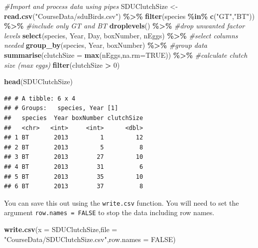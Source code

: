 \documentclass[
  a4paperpaper,
]{book}
\newenvironment{Shaded}{\begin{snugshade}}{\end{snugshade}}
\newcommand{\CommentTok}[1]{\textcolor[rgb]{0.56,0.35,0.01}{\textit{#1}}}
\newcommand{\DataTypeTok}[1]{\textcolor[rgb]{0.13,0.29,0.53}{#1}}
\newcommand{\DecValTok}[1]{\textcolor[rgb]{0.00,0.00,0.81}{#1}}
\newcommand{\KeywordTok}[1]{\textcolor[rgb]{0.13,0.29,0.53}{\textbf{#1}}}
\newcommand{\NormalTok}[1]{#1}
\newcommand{\OperatorTok}[1]{\textcolor[rgb]{0.81,0.36,0.00}{\textbf{#1}}}
\newcommand{\OtherTok}[1]{\textcolor[rgb]{0.56,0.35,0.01}{#1}}
\newcommand{\StringTok}[1]{\textcolor[rgb]{0.31,0.60,0.02}{#1}}
\begin{document}
\begin{Shaded}
\begin{Highlighting}[]
\CommentTok{\#Import and process data using pipes}
\NormalTok{SDUClutchSize \textless{}{-}}\StringTok{ }\KeywordTok{read.csv}\NormalTok{(}\StringTok{"CourseData/sduBirds.csv"}\NormalTok{) }\OperatorTok{\%\textgreater{}\%}\StringTok{ }
\StringTok{  }\KeywordTok{filter}\NormalTok{(species }\OperatorTok{\%in\%}\StringTok{ }\KeywordTok{c}\NormalTok{(}\StringTok{"GT"}\NormalTok{,}\StringTok{"BT"}\NormalTok{)) }\OperatorTok{\%\textgreater{}\%}\StringTok{ }\CommentTok{\#include only GT and BT}
\StringTok{  }\KeywordTok{droplevels}\NormalTok{() }\OperatorTok{\%\textgreater{}\%}\StringTok{ }\CommentTok{\#drop unwanted factor levels}
\StringTok{  }\KeywordTok{select}\NormalTok{(species, Year, Day, boxNumber, nEggs) }\OperatorTok{\%\textgreater{}\%}\StringTok{ }\CommentTok{\#select columns needed}
\StringTok{  }\KeywordTok{group\_by}\NormalTok{(species, Year, boxNumber) }\OperatorTok{\%\textgreater{}\%}\StringTok{ }\CommentTok{\#group data}
\StringTok{  }\KeywordTok{summarise}\NormalTok{(}\DataTypeTok{clutchSize =} \KeywordTok{max}\NormalTok{(nEggs,}\DataTypeTok{na.rm=}\OtherTok{TRUE}\NormalTok{)) }\OperatorTok{\%\textgreater{}\%}\StringTok{ }\CommentTok{\#calculate clutch size (max eggs)}
\StringTok{  }\KeywordTok{filter}\NormalTok{(clutchSize }\OperatorTok{\textgreater{}}\StringTok{ }\DecValTok{0}\NormalTok{)}

\KeywordTok{head}\NormalTok{(SDUClutchSize)}
\end{Highlighting}
\end{Shaded}

\begin{verbatim}
## # A tibble: 6 x 4
## # Groups:   species, Year [1]
##   species  Year boxNumber clutchSize
##   <chr>   <int>     <int>      <dbl>
## 1 BT       2013         1         12
## 2 BT       2013         5          8
## 3 BT       2013        27         10
## 4 BT       2013        31          6
## 5 BT       2013        35         10
## 6 BT       2013        37          8
\end{verbatim}

You can save this out using the \texttt{write.csv} function. You will need to set the argument \texttt{row.names\ =\ FALSE} to stop the data including row names.

\begin{Shaded}
\begin{Highlighting}[]
\KeywordTok{write.csv}\NormalTok{(}\DataTypeTok{x =}\NormalTok{ SDUClutchSize,}\DataTypeTok{file =} \StringTok{"CourseData/SDUClutchSize.csv"}\NormalTok{,}\DataTypeTok{row.names =} \OtherTok{FALSE}\NormalTok{)}
\end{Highlighting}
\end{Shaded}
\end{document}
